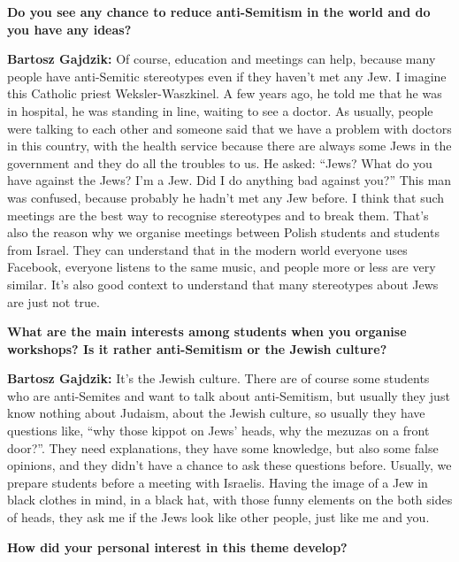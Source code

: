 \textbf{Do you see any chance to reduce anti-Semitism in the world and do you have any ideas?} 

\textbf{Bartosz Gajdzik:} Of course, education and meetings can help, because many people have anti-Semitic stereotypes even if they haven’t met any Jew. I imagine this Catholic priest Weksler-Waszkinel. A few years ago, he told me that he was in hospital, he was standing in line, waiting to see a doctor. As usually, people were talking to each other and someone said that we have a problem with doctors in this country, with the health service because there are always some Jews in the government and they do all the troubles to us. He asked: ``Jews? What do you have against the Jews? I’m a Jew. Did I do anything bad against you?'' This man was confused, because probably he hadn’t met any Jew before. I think that such meetings are the best way to recognise stereotypes and to break them. That’s also the reason why we organise meetings between Polish students and students from Israel. They can understand that in the modern world everyone uses Facebook, everyone listens to the same music, and people more or less are very similar. It’s also good context to understand that many stereotypes about Jews are just not true.  

\textbf{What are the main interests among students when you organise workshops? Is it rather anti-Semitism or the Jewish culture?}   

\textbf{Bartosz Gajdzik:} It’s the Jewish culture. There are of course some students who are anti-Semites and want to talk about anti-Semitism, but usually they just know nothing about Judaism, about the Jewish culture, so usually they have questions like, ``why those kippot on Jews’ heads, why the mezuzas on a front door?''. They need explanations, they have some knowledge, but also some false opinions, and they didn’t have a chance to ask these questions before. Usually, we prepare students before a meeting with Israelis. Having the image of a Jew in black clothes in mind, in a black hat, with those funny elements on the both sides of heads, they ask me if the Jews look like other people, just like me and you.  

\textbf{How did your personal interest in this theme develop?} 

